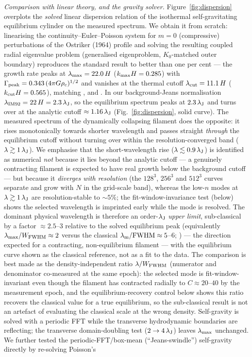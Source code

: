 \documentclass[usenatbib,twoside,twocolumn]{mnras}
\begin{document}
\emph{Comparison with linear theory, and the gravity solver.} Figure~\ref{fig:dispersion} overplots the \emph{solved} linear dispersion relation of the isothermal self-gravitating equilibrium cylinder on the measured spectrum. We obtain it from scratch: linearising the continuity--Euler--Poisson system for $m=0$ (compressive) perturbations of the Ostriker (1964) profile and solving the resulting coupled radial eigenvalue problem (generalised eigenproblem, $K_0$-matched outer boundary) reproduces the standard result to better than one per cent --- the growth rate peaks at $\lambda_{\rm max}=22.0\,H$ ($k_{\rm max}H=0.285$) with $\Gamma_{\rm peak}=0.343\,(4\pi G\rho_c)^{1/2}$ and vanishes at the thermal cutoff $\lambda_{\rm cut}=11.1\,H$ ($k_{\rm cut}H=0.565$), matching \citet{Nagasawa1987}, \citet{Inutsuka1992} and \citet{Fischera2012}. In our background-Jeans normalisation $\lambda_{\rm IM92}=22\,H=2.3\,\lambda_{\rm J}$, so the equilibrium spectrum peaks at $2.3\,\lambda_{\rm J}$ and turns over at the analytic cutoff $\approx1.16\,\lambda_{\rm J}$ (Fig.~\ref{fig:dispersion}, solid curve). The measured spectrum of the dynamically collapsing filament does the opposite: it rises monotonically towards shorter wavelength and passes straight \emph{through} the equilibrium cutoff without turning over within the resolution-converged band ($\lambda\gtrsim1\,\lambda_{\rm J}$). We emphasise that the short-wavelength rise ($\lambda\lesssim0.9\,\lambda_{\rm J}$) is identified as numerical \emph{not} because it lies beyond the analytic cutoff --- a genuinely contracting filament is expected to have real growth below the background cutoff --- but because it \emph{diverges with resolution} (the $128^3$, $256^3$ and $512^3$ curves separate and grow with $N$ in the grid-scale band), whereas the low-$n$ modes at $\lambda\gtrsim1\,\lambda_{\rm J}$ are resolution-stable to $\sim5\%$; the fit-window-invariance test (below) shows the selected wavelength is imprinted early while the mode is resolved. The dominant physical wavelength is therefore an order-$\lambda_{\rm J}$ \emph{upper limit}, sub-classical by a factor $\approx2.5$--$3$ relative to the solved equilibrium peak (equivalently $\lambda_{\rm max}/W_{\rm FWHM}\approx2$ versus the classical $\lambda_{\rm m}/{\rm FWHM}\approx5$--$6$; \citealt{Fischera2012}) --- the direction expected for a contracting, non-equilibrium filament \citep{Clarke2016,Clarke2017} --- with the equilibrium curve shown as the classical reference, not as a fit to the data. The comparison is best made as the density-independent ratio $\lambda/W_{\rm FWHM}$ (numerator and denominator co-measured at the same epoch): the selected mode is fit-window-invariant even though the filament has contracted radially to $C\approx20$--$40$ by the measurement epoch, and the equilibrium-recovery control below shows this ratio recovers the classical value for a true equilibrium, so the sub-classical result is not an artefact of evaluating the classical scale at the wrong density. Self-gravity is solved with a periodic FFT while the transverse hydrodynamic boundaries are reflecting; the transverse domain-doubling test ($2\to4\,\lambda_{\rm J}$) leaves $\lambda_{\rm max}$ unchanged. We further tested the periodic-FFT/box-mean (``Jeans-swindle'') self-gravity directly by re-solving Poisson's 
\end{document}
